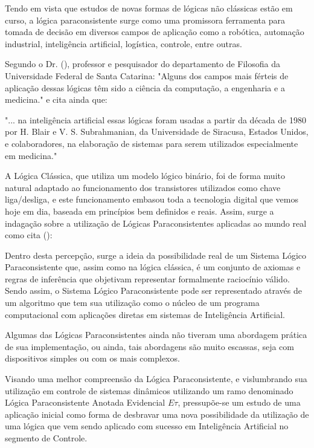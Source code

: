 
Tendo em vista que estudos de novas formas de lógicas não clássicas estão em curso, a lógica paraconsistente surge como uma promissora ferramenta para tomada de decisão em diversos campos de aplicação como a robótica, automação industrial, inteligência artificial, logística, controle, entre outras\cite{JoaoInacio}.
 
Segundo o Dr. \citeauthor{DecioKrause}(\citeyear{DecioKrause}), professor e pesquisador do departamento de Filosofia da Universidade Federal de Santa Catarina: "Alguns dos campos mais férteis de aplicação dessas lógicas têm sido a ciência da computação, a engenharia e a medicina." e cita ainda que:
\begin{citacao}{
 "... na inteligência artificial essas lógicas foram usadas a partir da década de 1980 por H. Blair e V. S. Subrahmanian, da Universidade de Siracusa, Estados Unidos, e colaboradores, na elaboração de sistemas para serem utilizados especialmente em medicina." 
}
\end{citacao}

A Lógica Clássica, que utiliza um modelo lógico binário, foi de forma muito natural adaptado ao funcionamento dos transistores utilizados como chave liga/desliga, e este funcionamento embasou toda a tecnologia digital que vemos hoje em dia, baseada em princípios bem definidos e reais. Assim, surge a indagação sobre a utilização de Lógicas Paraconsistentes aplicadas ao mundo real como cita \citeauthor{JISF2011}(\citeyear{JISF2011}):

\begin{citacao}{
Dentro desta percepção, surge a ideia da possibilidade real de um Sistema Lógico Paraconsistente que, assim como na lógica clássica, é um conjunto de axiomas e regras de inferência que objetivam representar formalmente raciocínio válido. Sendo assim, o Sistema Lógico Paraconsistente pode ser representado através de um algoritmo que tem sua utilização como o núcleo de um programa computacional com aplicações diretas em sistemas de Inteligência Artificial.
}
\end{citacao}



Algumas das Lógicas Paraconsistentes ainda não tiveram  uma abordagem prática de sua implementação, ou ainda, tais abordagens são muito escassas, seja com dispositivos simples ou com os mais complexos. 

Visando uma melhor compreensão da Lógica Paraconsistente, 
e vislumbrando sua utilização em controle de sistemas dinâmicos 
utilizando um ramo denominado 
Lógica Paraconsistente Anotada Evidencial $E\tau$, 
pressupõe-se um estudo de uma aplicação inicial 
como forma de desbravar uma nova possibilidade da utilização 
de uma lógica que vem sendo aplicado com sucesso em 
Inteligência Artificial no segmento de Controle.







